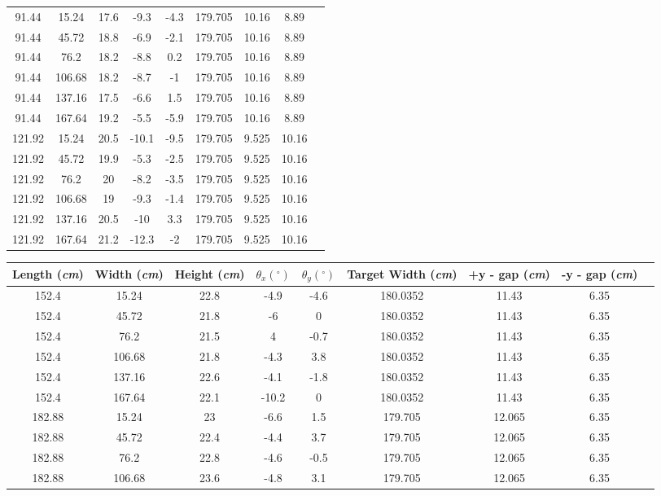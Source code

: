 \begin{landscape}
\begin{center}
\begin{tabular}{| c | c | c | c | c | c | c | c | c |}
91.44 & 15.24 & 17.6 & -9.3 & -4.3 & 179.705 & 10.16 & 8.89 \\
91.44 & 45.72 & 18.8 & -6.9 & -2.1 & 179.705 & 10.16 & 8.89 \\
91.44 & 76.2 & 18.2 & -8.8 & 0.2 & 179.705 & 10.16 & 8.89 \\
91.44 & 106.68 & 18.2 & -8.7 & -1 & 179.705 & 10.16 & 8.89 \\
91.44 & 137.16 & 17.5 & -6.6 & 1.5 & 179.705 & 10.16 & 8.89 \\
91.44 & 167.64 & 19.2 & -5.5 & -5.9 & 179.705 & 10.16 & 8.89 \\
121.92 & 15.24 & 20.5 & -10.1 & -9.5 & 179.705 & 9.525 & 10.16 \\
121.92 & 45.72 & 19.9 & -5.3 & -2.5 & 179.705 & 9.525 & 10.16 \\
121.92 & 76.2 & 20 & -8.2 & -3.5 & 179.705 & 9.525 & 10.16 \\
121.92 & 106.68 & 19 & -9.3 & -1.4 & 179.705 & 9.525 & 10.16 \\
121.92 & 137.16 & 20.5 & -10 & 3.3 & 179.705 & 9.525 & 10.16 \\
121.92 & 167.64 & 21.2 & -12.3 & -2 & 179.705 & 9.525 & 10.16 \\
\hline
\end{tabular}
\begin{tabular}{| c | c | c | c | c | c | c | c | c |} \hline
Length (\textit{cm}) & Width (\textit{cm}) & Height (\textit{cm}) & $\theta_{x} (^{\circ})$ & $\theta_{y} (^{\circ})$ & Target Width (\textit{cm}) & +y - gap (\textit{cm}) & -y - gap (\textit{cm}) \\
\hline \hline
152.4 & 15.24 & 22.8 & -4.9 & -4.6 & 180.0352 & 11.43 & 6.35 \\
152.4 & 45.72 & 21.8 & -6 & 0 & 180.0352 & 11.43 & 6.35 \\
152.4 & 76.2 & 21.5 & 4 & -0.7 & 180.0352 & 11.43 & 6.35 \\
152.4 & 106.68 & 21.8 & -4.3 & 3.8 & 180.0352 & 11.43 & 6.35 \\
152.4 & 137.16 & 22.6 & -4.1 & -1.8 & 180.0352 & 11.43 & 6.35 \\
152.4 & 167.64 & 22.1 & -10.2 & 0 & 180.0352 & 11.43 & 6.35 \\
182.88 & 15.24 & 23 & -6.6 & 1.5 & 179.705 & 12.065 & 6.35 \\
182.88 & 45.72 & 22.4 & -4.4 & 3.7 & 179.705 & 12.065 & 6.35 \\
182.88 & 76.2 & 22.8 & -4.6 & -0.5 & 179.705 & 12.065 & 6.35 \\
182.88 & 106.68 & 23.6 & -4.8 & 3.1 & 179.705 & 12.065 & 6.35 \\

\end{tabular}
\end{center}
\end{landscape}
